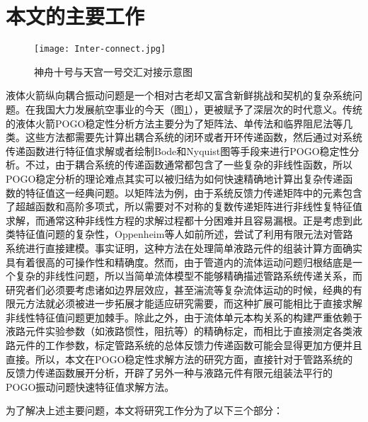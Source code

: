 \section{本文的主要工作}

\begin{figure}[!b]
  \centering
  \texttt{[image: Inter-connect.jpg]}
  \caption{神舟十号与天宫一号交汇对接示意图}\label{China-Manned-Flight}
\end{figure}

液体火箭纵向耦合振动问题是一个相对古老却又富含新鲜挑战和契机的复杂系统问题。在我国大力发展航空事业的今天（图\ref{China-Manned-Flight}），更被赋予了深层次的时代意义。传统的液体火箭POGO稳定性分析方法主要分为了矩阵法、单传法和临界阻尼法\cite{Wang-Qizheng:1999}等几类。这些方法都需要先计算出耦合系统的闭环或者开环传递函数，然后通过对系统传递函数进行特征值求解或者绘制Bode和Nyquist图等手段来进行POGO稳定性分析。不过，由于耦合系统的传递函数通常都包含了一些复杂的非线性函数，所以POGO稳定分析的理论难点其实可以被归结为如何快速精确地计算出复杂传递函数的特征值这一经典问题。以矩阵法为例，由于系统反馈力传递矩阵中的元素包含了超越函数和高阶多项式，所以需要对不对称的复数传递矩阵进行非线性复特征值求解，而通常这种非线性方程的求解过程都十分困难并且容易漏根\cite{Dennis:1983, Golub:1996}。正是考虑到此类特征值问题的复杂性，Oppenheim\cite{Oppenheim:1993}等人如前所述，尝试了利用有限元法对管路系统进行直接建模。事实证明，这种方法在处理简单液路元件的组装计算方面确实具有着很高的可操作性和精确度。然而，由于管道内的流体运动问题归根结底是一个复杂的非线性问题\cite{Munson:1990, Paidoussis:1993, Morand:1995}，所以当简单流体模型不能够精确描述管路系统传递关系，而研究者们必须要考虑诸如边界层效应，甚至湍流等复杂流体运动的时候，经典的有限元方法就必须被进一步拓展才能适应研究需要，而这种扩展可能相比于直接求解非线性特征值问题更加棘手。除此之外，由于流体单元本构关系的构建严重依赖于液路元件实验参数（如液路惯性，阻抗等）的精确标定，而相比于直接测定各类液路元件的工作参数，标定管路系统的总体反馈力传递函数可能会显得更加方便并且直接。所以，本文在POGO稳定性求解方法的研究方面，直接针对于管路系统的反馈力传递函数展开分析，开辟了另外一种与液路元件有限元组装法平行的POGO振动问题快速特征值求解方法。

为了解决上述主要问题，本文将研究工作分为了以下三个部分：


